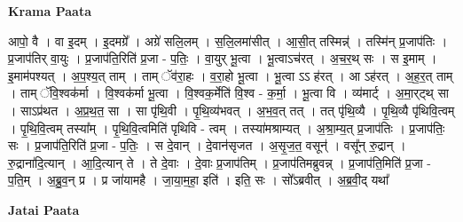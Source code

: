 \documentclass[17pt]{extarticle}
\begin{document}
\textbf{Krama Paata} \newline

आपो॒ वै । वा इ॒दम् । इ॒दमग्रे᳚ । अग्रे॑ सलि॒लम् । स॒लि॒लमा॑सीत् । आ॒सी॒त् तस्मिन्न्॑ । तस्मि॑न् प्र॒जाप॑तिः । प्र॒जाप॑तिर् वा॒युः । प्र॒जाप॑ति॒रिति॑ प्र॒जा - प॒तिः॒ । वा॒युर् भू॒त्वा । भू॒त्वाऽच॑रत् । अ॒च॒र॒थ् सः । स इ॒माम् । इ॒माम॑पश्यत् । अ॒प॒श्य॒त् ताम् । ताम् ॅव॑रा॒हः । व॒रा॒हो भू॒त्वा । भू॒त्वा ऽऽ ह॑रत् । आ ऽह॑रत् । अ॒ह॒र॒त् ताम् । ताम् ॅवि॒श्वक॑र्मा । वि॒श्वक॑र्मा भू॒त्वा । वि॒श्वक॒र्मेति॑ वि॒श्व - क॒र्मा॒ । भू॒त्वा वि । व्य॑मार्ट् । अ॒मा॒र्‌ट्थ् सा । साऽप्र॑थत । अ॒प्र॒थ॒त॒ सा । सा पृ॑थि॒वी । पृ॒थि॒व्य॑भवत् । अ॒भ॒व॒त् तत् । तत् पृ॑थि॒व्यै । पृ॒थि॒व्यै पृ॑थिवि॒त्वम् । पृ॒थि॒वि॒त्वम् तस्या᳚म् । पृ॒थि॒वि॒त्वमिति॑ पृथिवि - त्वम् । तस्या॑मश्राम्यत् । अ॒श्रा॒म्य॒त् प्र॒जाप॑तिः । प्र॒जाप॑तिः॒ सः । प्र॒जाप॑ति॒रिति॑ प्र॒जा - प॒तिः॒ । स दे॒वान् । दे॒वान॑सृजत । अ॒सृ॒ज॒त॒ वसून्॑ । वसू᳚न् रु॒द्रान् । रु॒द्राना॑दि॒त्यान् । आ॒दि॒त्यान् ते । ते दे॒वाः । दे॒वाः प्र॒जाप॑तिम् । प्र॒जाप॑तिमब्रुवन्न् । प्र॒जाप॑ति॒मिति॑ प्र॒जा - प॒ति॒म् । अ॒ब्रु॒व॒न् प्र । प्र जा॑यामहै । जा॒या॒म॒हा॒ इति॑ । इति॒ सः । सो᳚ऽब्रवीत् । अ॒ब्र॒वी॒द् यथा᳚ \newline

\textbf{Jatai Paata} \newline
\end{document}
